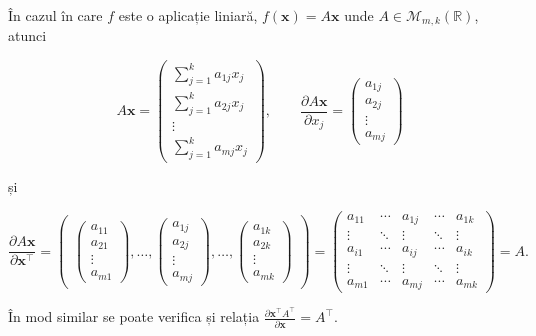 \documentclass[]{article}
\begin{document}
În cazul în care \(f\) este o aplicație liniară,
\(f(\boldsymbol x) = A \boldsymbol x\) unde
\(A\in\mathcal{M}_{m,k}(\mathbb{R})\), atunci

\[
  A \boldsymbol x = \begin{pmatrix}\sum_{j=1}^{k}a_{1j} x_j\\
  \sum_{j=1}^{k}a_{2j} x_j\\
  \vdots\\
  \sum_{j=1}^{k}a_{mj} x_j\end{pmatrix}, \qquad \frac{\partial A \boldsymbol x}{\partial x_j} = \begin{pmatrix}a_{1j}\\
  a_{2j}\\
  \vdots\\
  a_{mj}\end{pmatrix}
\]

și

\[
  \frac{\partial A \boldsymbol x}{\partial \boldsymbol x^\intercal} = \begin{pmatrix}\begin{pmatrix}a_{11}\\
  a_{21}\\
  \vdots\\
  a_{m1}\end{pmatrix}, \ldots, \begin{pmatrix}a_{1j}\\
  a_{2j}\\
  \vdots\\
  a_{mj}\end{pmatrix}, \ldots, \begin{pmatrix}a_{1k}\\
  a_{2k}\\
  \vdots\\
  a_{mk}\end{pmatrix}\end{pmatrix} = \begin{pmatrix}a_{11} & \cdots & a_{1j} & \cdots & a_{1k}\\
  \vdots & \ddots & \vdots & \ddots & \vdots\\
  a_{i1} & \cdots & a_{ij} & \cdots & a_{ik}\\
  \vdots & \ddots & \vdots & \ddots & \vdots\\
  a_{m1} & \cdots & a_{mj} & \cdots & a_{mk}
  \end{pmatrix} = A.
\]

În mod similar se poate verifica și relația
\(\frac{\partial \boldsymbol x^\intercal A^\intercal}{\partial \boldsymbol x} = A^\intercal\).
\end{document}
